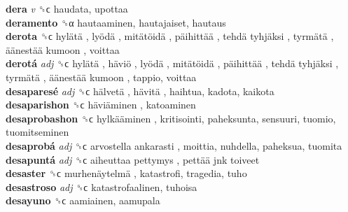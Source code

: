 \textbf{dera} \emph{v}  ␝ϲ  haudata, upottaa  \\
\textbf{deramento} ␝α  hautaaminen, hautajaiset, hautaus  \\
\textbf{derota} ␝ϲ   hylätä ,  lyödä ,  mitätöidä ,  päihittää ,  tehdä tyhjäksi ,  tyrmätä ,  äänestää kumoon , voittaa  \\
\textbf{derotá} \emph{adj}  ␝ϲ   hylätä ,  häviö ,  lyödä ,  mitätöidä ,  päihittää ,  tehdä tyhjäksi ,  tyrmätä ,  äänestää kumoon , tappio, voittaa  \\
\textbf{desaparesé} \emph{adj}  ␝ϲ   hälvetä ,  hävitä , haihtua, kadota, kaikota  \\
\textbf{desaparishon} ␝ϲ   häviäminen , katoaminen  \\
\textbf{desaprobashon} ␝ϲ   hylkääminen , kritisointi, paheksunta, sensuuri, tuomio, tuomitseminen  \\
\textbf{desaprobá} \emph{adj}  ␝ϲ   arvostella ankarasti , moittia, nuhdella, paheksua, tuomita  \\
\textbf{desapuntá} \emph{adj}  ␝ϲ   aiheuttaa pettymys ,  pettää jnk toiveet   \\
\textbf{desaster} ␝ϲ   murhenäytelmä , katastrofi, tragedia, tuho  \\
\textbf{desastroso} \emph{adj}  ␝ϲ  katastrofaalinen, tuhoisa  \\
\textbf{desayuno} ␝ϲ  aamiainen, aamupala  \\
